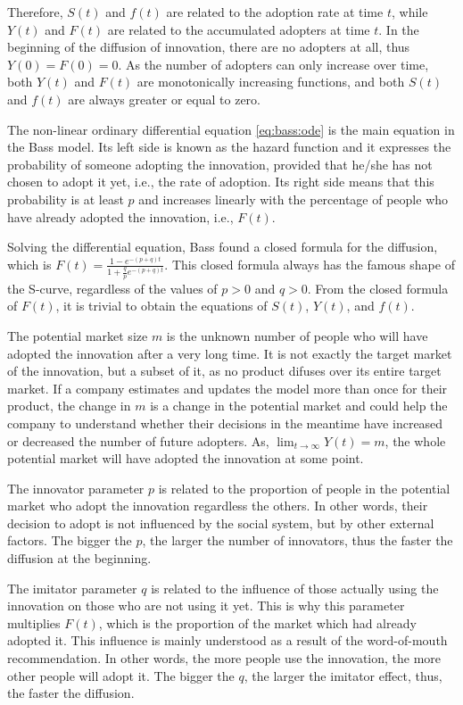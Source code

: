 Therefore, $S(t)$ and $f(t)$ are related to the adoption rate at time $t$, while $Y(t)$ and $F(t)$ are related to the accumulated adopters at time $t$. In the beginning of the diffusion of innovation, there are no adopters at all, thus $Y(0) = F(0) = 0$. As the number of adopters can only increase over time, both $Y(t)$ and $F(t)$ are monotonically increasing functions, and both $S(t)$ and $f(t)$ are always greater or equal to zero.

The non-linear ordinary differential equation \ref{eq:bass:ode} is the main equation in the Bass model. Its left side is known as the hazard function and it expresses the probability of someone adopting the innovation, provided that he/she has not chosen to adopt it yet, i.e., the rate of adoption. Its right side means that this probability is at least $p$ and increases linearly with the percentage of people who have already adopted the innovation, i.e., $F(t)$.

Solving the differential equation, Bass found a closed formula for the diffusion, which is $F(t) = \frac{ 1 - e^{-(p+q)t} }{ 1 + \frac{q}{p} e^{-(p+q)t} }$. This closed formula always has the famous shape of the S-curve, regardless of the values of $p > 0$ and $q > 0$. From the closed formula of $F(t)$, it is trivial to obtain the equations of $S(t)$, $Y(t)$, and $f(t)$.

The potential market size $m$ is the unknown number of people who will have adopted the innovation after a very long time. It is not exactly the target market of the innovation, but a subset of it, as no product difuses over its entire target market. If a company estimates and updates the model more than once for their product, the change in $m$ is a change in the potential market and could help the company to understand whether their decisions in the meantime have increased or decreased the number of future adopters. As, $\lim_{t \rightarrow \infty} Y(t) = m$, the whole potential market will have adopted the innovation at some point.

The innovator parameter $p$ is related to the proportion of people in the potential market who adopt the innovation regardless the others. In other words, their decision to adopt is not influenced by the social system, but by other external factors. The bigger the $p$, the larger the number of innovators, thus the faster the diffusion at the beginning.

The imitator parameter $q$ is related to the influence of those actually using the innovation on those who are not using it yet. This is why this parameter multiplies $F(t)$, which is the proportion of the market which had already adopted it. This influence is mainly understood as a result of the word-of-mouth recommendation. In other words, the more people use the innovation, the more other people will adopt it. The bigger the $q$, the larger the imitator effect, thus, the faster the diffusion.

